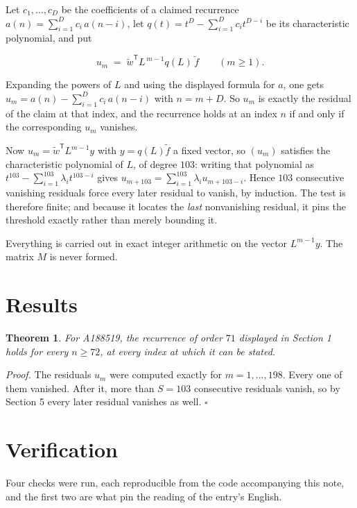 \documentclass[11pt]{article}
\newtheorem{theorem}{Theorem}
\theoremstyle{definition}
\begin{document}
Let $c_1,\dots,c_D$ be the coefficients of a claimed recurrence $a(n) = \sum_{i=1}^{D} c_i\,a(n-i)$, let $q(t) = t^{D} - \sum_{i=1}^{D} c_i t^{D-i}$ be its characteristic polynomial, and put

\[u_m \;=\; \tilde w^{\mathsf T} L^{\,m-1} q(L)\,\tilde f \qquad (m \ge 1).\]

Expanding the powers of $L$ and using the displayed formula for $a$, one gets $u_m = a(n) - \sum_{i=1}^{D} c_i\,a(n-i)$ with $n = m + D$. So $u_m$ is exactly the residual of the claim at that index, and the recurrence holds at an index $n$ if and only if the corresponding $u_m$ vanishes.

Now $u_m = \tilde w^{\mathsf T} L^{m-1} y$ with $y = q(L)\tilde f$ a fixed vector, so $(u_m)$ satisfies the characteristic polynomial of $L$, of degree $103$: writing that polynomial as $t^{103} - \sum_{i=1}^{103} \lambda_i t^{103-i}$ gives $u_{m+103} = \sum_{i=1}^{103} \lambda_i u_{m+103-i}$. Hence $103$ consecutive vanishing residuals force every later residual to vanish, by induction. The test is therefore finite; and because it locates the {\itshape last} nonvanishing residual, it pins the threshold exactly rather than merely bounding it.

Everything is carried out in exact integer arithmetic on the vector $L^{m-1}y$. The matrix $M$ is never formed.

\section{Results}

\begin{theorem} For A188519, the recurrence of order $71$ displayed in Section 1 holds for every $n \ge 72$, at every index at which it can be stated.\end{theorem}

{\itshape Proof.} The residuals $u_m$ were computed exactly for $m = 1,\dots,198$. Every one of them vanished. After it, more than $S = 103$ consecutive residuals vanish, so by Section 5 every later residual vanishes as well. $\square$

\section{Verification}

Four checks were run, each reproducible from the code accompanying this note, and the first two are what pin the reading of the entry's English.
\end{document}
